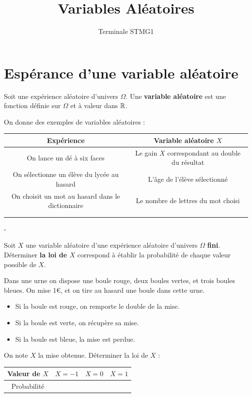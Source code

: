 \documentclass{poly}
\title{Variables Aléatoires}
\date{}
\author{Terminale STMG1}
\begin{document}
\maketitle
\section{Espérance d'une variable aléatoire}
\begin{definition}
Soit une expérience aléatoire d'univers $\Omega$. Une \textbf{variable aléatoire} est une fonction définie sur $\Omega$ et à valeur dans $\mathbb{R}$. 
\end{definition}
\begin{example}
On donne des exemples de variables aléatoires :
\begin{center}
\begin{tabular}{|c|c|}
\hline
Expérience&Variable aléatoire $X$\\
\hline
On lance un dé à six faces & Le gain $X$ correspondant au double du résultat\\
\hline
On sélectionne un élève du lycée au hasard & L'âge de l'élève sélectionné\\
\hline
On choisit un mot au hasard dans le dictionnaire & Le nombre de lettres du mot choisi\\
\hline
&\\
\hline
&\\
\hline
\end{tabular}
\end{center}
\end{example}-
\begin{definition}
Soit $X$ une variable aléatoire d'une expérience aléatoire d'univers $\Omega$ \textbf{fini}. Déterminer \textbf{la loi de $X$} correspond à établir la probabilité de chaque valeur possible de $X$.
\end{definition}
\begin{example}
Dans une urne on dispose une boule rouge, deux boules vertes, et trois boules bleues. On mise 1€, et on tire au hasard une boule dans cette urne.
\begin{itemize}
\item Si la boule est rouge, on remporte le double de la mise.
\item Si la boule est verte, on récupère sa mise.
\item Si la boule est bleue, la mise est perdue.
\end{itemize}
On note $X$ la mise obtenue. Déterminer la loi de $X$ :
\begin{center}
\begin{tabular}{|c|c|c|c|}
\hline
Valeur de $X$&$X=-1$&$X=0$&$X=1$\\
\hline
Probabilité&&&\\
\hline
\end{tabular}
\end{center}
\end{example}
\end{document}
